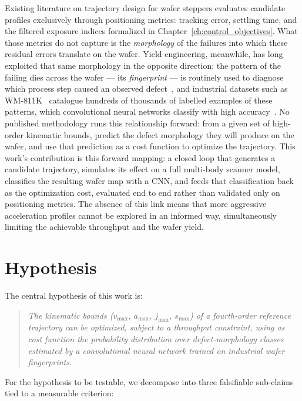 Existing literature on trajectory design for wafer steppers evaluates candidate profiles exclusively through positioning metrics: tracking error, settling time, and the filtered exposure indices formalized in Chapter~\ref{ch:control_objectives}. What those metrics do not capture is the \textit{morphology} of the failures into which these residual errors translate on the wafer. Yield engineering, meanwhile, has long exploited that same morphology in the opposite direction: the pattern of the failing dies across the wafer — its \textit{fingerprint} — is routinely used to diagnose which process step caused an observed defect~\cite{Lam2015_Fingerprint}, and industrial datasets such as WM-811K~\cite{Wu2015_WM811K} catalogue hundreds of thousands of labelled examples of these patterns, which convolutional neural networks classify with high accuracy~\cite{Nakazawa2018_WaferCNN, Jeong2023_GeometricCNN}. No published methodology runs this relationship forward: from a given set of high-order kinematic bounds, predict the defect morphology they will produce on the wafer, and use that prediction as a cost function to optimize the trajectory. This work's contribution is this forward mapping: a closed loop that generates a candidate trajectory, simulates its effect on a full multi-body scanner model, classifies the resulting wafer map with a CNN, and feeds that classification back as the optimization cost, evaluated end to end rather than validated only on positioning metrics. The absence of this link means that more aggressive acceleration profiles cannot be explored in an informed way, simultaneously limiting the achievable throughput and the wafer yield.

\section{Hypothesis}\label{sec:intro_hypothesis}

The central hypothesis of this work is:

\begin{quote}
\textit{The kinematic bounds ($v_{\max}$, $a_{\max}$, $j_{\max}$, $s_{\max}$) of a fourth-order reference trajectory can be optimized, subject to a throughput constraint, using as cost function the probability distribution over defect-morphology classes estimated by a convolutional neural network trained on industrial wafer fingerprints.}
\end{quote}

For the hypothesis to be testable, we decompose into three falsifiable sub-claims tied to a measurable criterion:

